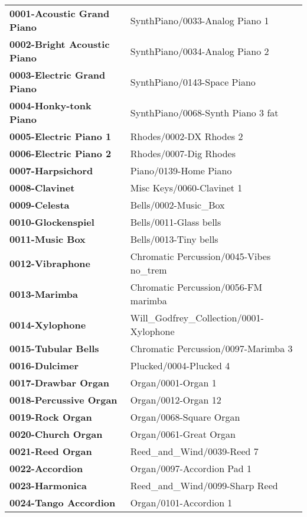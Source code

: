 \begin{longtable}{|l l|}
   \textbf{0001-Acoustic Grand Piano} &
      SynthPiano/0033-Analog Piano 1 \\
   \textbf{0002-Bright Acoustic Piano} &
      SynthPiano/0034-Analog Piano 2 \\
   \textbf{0003-Electric Grand Piano} &
      SynthPiano/0143-Space Piano \\
   \textbf{0004-Honky-tonk Piano} &
      SynthPiano/0068-Synth Piano 3 fat \\
   \textbf{0005-Electric Piano 1} &
      Rhodes/0002-DX Rhodes 2 \\
   \textbf{0006-Electric Piano 2} &
      Rhodes/0007-Dig Rhodes \\
   \textbf{0007-Harpsichord} &
      Piano/0139-Home Piano \\
   \textbf{0008-Clavinet} &
      Misc Keys/0060-Clavinet 1 \\
   \textbf{0009-Celesta} &
      Bells/0002-Music\_Box \\
   \textbf{0010-Glockenspiel} &
      Bells/0011-Glass bells \\
   \textbf{0011-Music Box} &
      Bells/0013-Tiny bells \\
   \textbf{0012-Vibraphone} &
      Chromatic Percussion/0045-Vibes no\_trem \\
   \textbf{0013-Marimba} &
      Chromatic Percussion/0056-FM marimba \\
   \textbf{0014-Xylophone} &
      Will\_Godfrey\_Collection/0001-Xylophone \\
   \textbf{0015-Tubular Bells} &
      Chromatic Percussion/0097-Marimba 3 \\
   \textbf{0016-Dulcimer} &
      Plucked/0004-Plucked 4 \\
   \textbf{0017-Drawbar Organ} &
      Organ/0001-Organ 1 \\
   \textbf{0018-Percussive Organ} &
      Organ/0012-Organ 12 \\
   \textbf{0019-Rock Organ} &
      Organ/0068-Square Organ \\
   \textbf{0020-Church Organ} &
      Organ/0061-Great Organ \\
   \textbf{0021-Reed Organ} &
      Reed\_and\_Wind/0039-Reed 7 \\
   \textbf{0022-Accordion} &
      Organ/0097-Accordion Pad 1 \\
   \textbf{0023-Harmonica} &
      Reed\_and\_Wind/0099-Sharp Reed \\
   \textbf{0024-Tango Accordion} &
      Organ/0101-Accordion 1 \\

\end{longtable}
